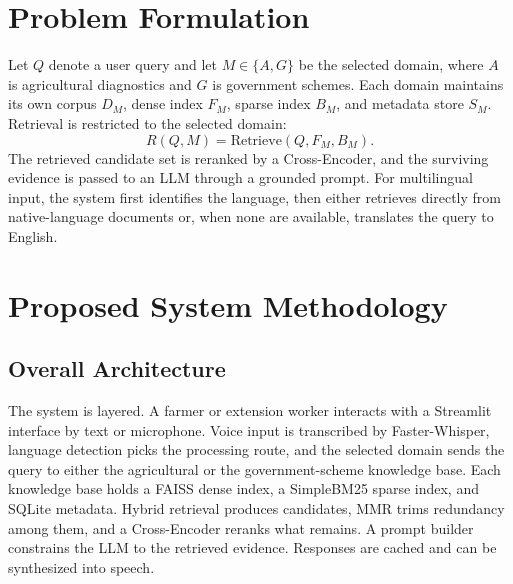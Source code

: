 \documentclass[10pt,twocolumn,letterpaper]{article}
\begin{document}
\section{Problem Formulation}
Let $Q$ denote a user query and let $M \in \{A, G\}$ be the selected domain, where $A$ is agricultural diagnostics and $G$ is government schemes. Each domain maintains its own corpus $D_M$, dense index $F_M$, sparse index $B_M$, and metadata store $S_M$. Retrieval is restricted to the selected domain:
\begin{equation}
R(Q, M) = \mathrm{Retrieve}(Q, F_M, B_M).
\end{equation}
The retrieved candidate set is reranked by a Cross-Encoder, and the surviving evidence is passed to an LLM through a grounded prompt. For multilingual input, the system first identifies the language, then either retrieves directly from native-language documents or, when none are available, translates the query to English.

\section{Proposed System Methodology}
\subsection{Overall Architecture}
The system is layered. A farmer or extension worker interacts with a Streamlit interface by text or microphone. Voice input is transcribed by Faster-Whisper, language detection picks the processing route, and the selected domain sends the query to either the agricultural or the government-scheme knowledge base. Each knowledge base holds a FAISS dense index, a SimpleBM25 sparse index, and SQLite metadata. Hybrid retrieval produces candidates, MMR trims redundancy among them, and a Cross-Encoder reranks what remains. A prompt builder constrains the LLM to the retrieved evidence. Responses are cached and can be synthesized into speech.
\end{document}
